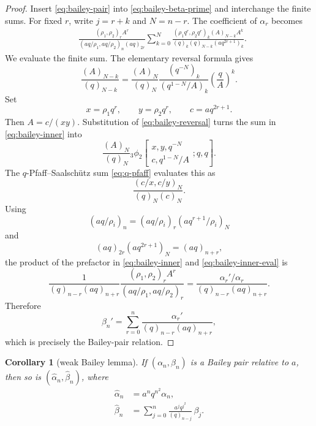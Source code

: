 \documentclass[11pt,oneside]{article}
\newtheorem{corollary}[theorem]{Corollary}
\theoremstyle{definition}
\newcommand{\BaileyTransformedAlpha}{\widehat{\alpha}}
\newcommand{\BaileyTransformedBeta}{\widehat{\beta}}
\begin{document}
\begin{proof}
Insert \eqref{eq:bailey-pair} into \eqref{eq:bailey-beta-prime} and
interchange the finite sums.  For fixed $r$, write $j=r+k$ and
$N=n-r$.  The coefficient of $\alpha_r$ becomes
\begin{align}
 &\frac{(\rho_1,\rho_2)_rA^r}
 {(aq/\rho_1,aq/\rho_2)_n(aq)_{2r}}
 \sum_{k=0}^{N}
 \frac{(\rho_1q^r,\rho_2q^r)_k(A)_{N-k}A^k}
 {(q)_k(q)_{N-k}(aq^{2r+1})_k}.
 \label{eq:bailey-inner}
\end{align}
We evaluate the finite sum.  The elementary reversal formula gives
\begin{equation}\label{eq:bailey-reversal}
 \frac{(A)_{N-k}}{(q)_{N-k}}
 =
 \frac{(A)_N}{(q)_N}
 \frac{(q^{-N})_k}{(q^{1-N}/A)_k}
 \left(\frac qA\right)^k.
\end{equation}
Set
\[
 x=\rho_1q^r,\qquad y=\rho_2q^r,\qquad c=aq^{2r+1}.
\]
Then $A=c/(xy)$.  Substitution of \eqref{eq:bailey-reversal} turns the
sum in \eqref{eq:bailey-inner} into
\[
 \frac{(A)_N}{(q)_N}
 {}_3\phi_2\!\left[
 \begin{matrix}x,y,q^{-N}\\c,q^{1-N}/A\end{matrix};q,q
 \right].
\]
The $q$-Pfaff--Saalsch\"utz sum \eqref{eq:q-pfaff} evaluates this as
\begin{equation}\label{eq:bailey-inner-eval}
 \frac{(c/x,c/y)_N}{(q)_N(c)_N}.
\end{equation}
Using
\[
 (aq/\rho_i)_n=(aq/\rho_i)_r(aq^{r+1}/\rho_i)_N
\]
and
\[
 (aq)_{2r}(aq^{2r+1})_N=(aq)_{n+r},
\]
the product of the prefactor in \eqref{eq:bailey-inner} and
\eqref{eq:bailey-inner-eval} is
\[
 \frac{1}{(q)_{n-r}(aq)_{n+r}}
 \frac{(\rho_1,\rho_2)_rA^r}
 {(aq/\rho_1,aq/\rho_2)_r}
 =
 \frac{\alpha_r'/\alpha_r}{(q)_{n-r}(aq)_{n+r}}.
\]
Therefore
\[
 \beta_n'=\sum_{r=0}^{n}
 \frac{\alpha_r'}{(q)_{n-r}(aq)_{n+r}},
\]
which is precisely the Bailey-pair relation.
\end{proof}

\begin{corollary}[weak Bailey lemma]\label{cor:weak-bailey}
If $(\alpha_n,\beta_n)$ is a Bailey pair relative to $a$, then so is
$(\BaileyTransformedAlpha_n,\BaileyTransformedBeta_n)$, where
\begin{align}
\BaileyTransformedAlpha_n&=a^nq^{n^2}\alpha_n,\label{eq:weak-alpha}\\
\BaileyTransformedBeta_n&=\sum_{j=0}^{n}
 \frac{a^jq^{j^2}}{(q)_{n-j}}\,\beta_j.
 \label{eq:weak-beta}
\end{align}
\end{corollary}
\end{document}
